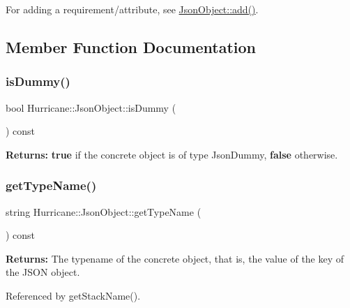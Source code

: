 For adding a requirement/attribute, see \mbox{\hyperlink{classHurricane_1_1JsonObject_a39ed04c118b19f1b6010b7f3336c360f}{Json\+Object\+::add()}}. 

\subsection{Member Function Documentation}
\mbox{\label{classHurricane_1_1JsonObject_a8f0949b75f5900e4ef87196e949cfa6b}} 
\subsubsection{\texorpdfstring{is\+Dummy()}{isDummy()}}
{\footnotesize\ttfamily bool Hurricane\+::\+Json\+Object\+::is\+Dummy (\begin{DoxyParamCaption}{ }\end{DoxyParamCaption}) const\hspace{0.3cm}{\ttfamily [virtual]}}

{\bfseries Returns\+:} {\bfseries true} if the concrete object is of type {\ttfamily Json\+Dummy}, {\bfseries false} otherwise. \mbox{\label{classHurricane_1_1JsonObject_a947e1c3f8dbae63bb2d086b5b827a2a5}} 
\subsubsection{\texorpdfstring{get\+Type\+Name()}{getTypeName()}}
{\footnotesize\ttfamily string Hurricane\+::\+Json\+Object\+::get\+Type\+Name (\begin{DoxyParamCaption}{ }\end{DoxyParamCaption}) const\hspace{0.3cm}{\ttfamily [pure virtual]}}

{\bfseries Returns\+:} The typename of the concrete object, that is, the value of the {\ttfamily }  key of the J\+S\+ON object. 

Referenced by get\+Stack\+Name().

\mbox{\label{classHurricane_1_1JsonObject_a34c4e38611238021df8cc69fc32f5e48}} 
